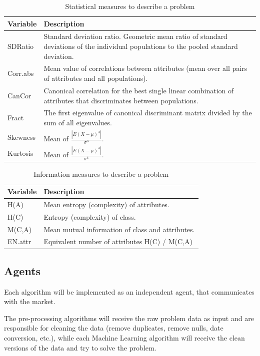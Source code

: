 \documentclass{llncs}
\begin{document}
\begin{table}[h]
\centering
\begin{tabular}{l p{10cm}}
\textbf{Variable} & \textbf{Description} \\
\hline
SDRatio & Standard deviation ratio. Geometric mean ratio of standard deviations of the individual populations to the pooled standard deviation. \\ 
Corr.abs & Mean value of correlations between attributes (mean over all pairs of attributes and all populations). \\
CanCor & Canonical correlation for the best single linear combination of attributes that discriminates between populations. \\
Fract & The first eigenvalue of canonical discriminant matrix divided by the sum of all eigenvalues. \\
Skewness &  Mean of $ \frac{| E(X-\mu)^3 |}{\sigma^3}$.\\
Kurtosis &  Mean of $\frac{| E(X-\mu)^4 |} {\sigma^4}$.\\
\hline
\end{tabular}
\caption{Statistical measures to describe a problem}
\label{tab:stat}
\end{table}


\begin{table}[h]
\centering
\begin{tabular}{l p{10cm}}
\textbf{Variable} & \textbf{Description} \\
\hline
H(A) & Mean entropy (complexity) of attributes.\\
H(C) & Entropy (complexity) of class.\\
M(C,A) & Mean mutual information of class and attributes.\\
EN.attr & Equivalent number of attributes H(C) / M(C,A)\\
\hline
\end{tabular}
\caption{Information measures to describe a problem}
\label{tab:inf}
\end{table}



\subsection{Agents}

Each algorithm will be implemented as an independent agent, that communicates with the market. 

The pre-processing algorithms will receive the raw problem data as input and are responsible for cleaning the data (remove duplicates, remove nulls, date conversion, etc.), while each Machine Learning algorithm will receive the clean versions of the data and try to solve the problem. 
\end{document}
